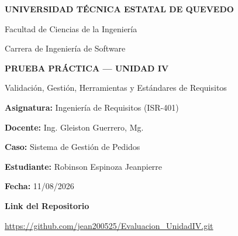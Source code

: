 \documentclass[12pt,a4paper]{article}
\begin{document}

\thispagestyle{empty}

\begin{center}

\vspace*{1cm}

{\Large\textbf{UNIVERSIDAD TÉCNICA ESTATAL DE QUEVEDO}\par}

\vspace{0.5cm}

{\large Facultad de Ciencias de la Ingeniería\par}
{\large Carrera de Ingeniería de Software\par}

\vspace{2cm}

{\Large\textbf{PRUEBA PRÁCTICA — UNIDAD IV}\par}

\vspace{0.5cm}

{\large Validación, Gestión, Herramientas y Estándares de Requisitos\par}

\vspace{2cm}

\textbf{Asignatura:} Ingeniería de Requisitos (ISR-401)

\vspace{0.5cm}

\textbf{Docente:} Ing. Gleiston Guerrero, Mg.

\vspace{0.5cm}

\textbf{Caso:} Sistema de Gestión de Pedidos

\vspace{1.5cm}

\textbf{Estudiante:} Robinson Espinoza Jeanpierre

\vspace{0.5cm}

\textbf{Fecha:} 11/08/2026

\vfill

\textbf{Link del Repositorio}

\vspace{0.3cm}

\url{https://github.com/jean200525/Evaluacion_UnidadIV.git}

\end{center}
\end{document}
